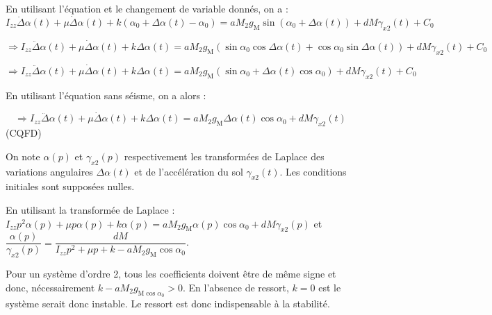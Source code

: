\ifprof
\begin{corrige} 
En utilisant l'équation et le changement de variable donnés, on  a : 
$$I_{z z} \ddot{\Delta}{\alpha}(t)+\mu \dot{\Delta}{\alpha}(t)+k\left(\alpha_{0}+\Delta \alpha(t)-\alpha_{0}\right)=a M_{2} g_{\mathrm{M}} \sin \left(\alpha_{0}+\Delta \alpha(t)\right)+d M \gamma_{x 2}(t)+C_{0}
$$

$$ \Rightarrow 
I_{z z} \ddot{\Delta}{\alpha}(t)+\mu \dot{\Delta}{\alpha}(t)+k\Delta \alpha(t)=a M_{2} g_{\mathrm{M}} \left( 
\sin \alpha_{0} \cos \Delta \alpha(t) + \cos \alpha_{0} \sin \Delta \alpha(t) 
\right)
+d M \gamma_{x 2}(t)+C_{0}
$$


$$ \Rightarrow 
I_{z z} \ddot{\Delta}{\alpha}(t)+\mu \dot{\Delta}{\alpha}(t)+k\Delta \alpha(t)=a M_{2} g_{\mathrm{M}} \left( 
\sin \alpha_{0}  + \Delta \alpha(t) \cos \alpha_{0}  \right)
+d M \gamma_{x 2}(t)+C_{0}
$$

En utilisant l'équation sans séisme, on a alors : 

$$ \Rightarrow 
I_{z z} \ddot{\Delta}{\alpha}(t)+\mu \dot{\Delta}{\alpha}(t)+k\Delta \alpha(t)
=a M_{2} g_{\mathrm{M}} \Delta \alpha(t) \cos \alpha_{0} +d M \gamma_{x 2}(t)
$$
(CQFD)
\end{corrige}
\else
\fi

On note $\alpha(p)$ et $\gamma_{x 2}(p)$ respectivement les transformées de Laplace des variations angulaires $\Delta \alpha(t)$ et de l'accélération du sol $\gamma_{x 2}(t)$. Les conditions initiales sont supposées nulles.

\ifprof
\begin{corrige}
En utilisant la transformée de Laplace : $ 
I_{z z} p^2 {\alpha}(p)+\mu p{\alpha}(p)+k\alpha(p)
=a M_{2} g_{\mathrm{M}} \alpha(p) \cos \alpha_{0} +d M \gamma_{x 2}(p)
$ et 
$\dfrac{\alpha(p)}{\gamma_{x 2}(p)} = \dfrac{d M }{I_{z z} p^2  +\mu p +k -a M_{2} g_{\mathrm{M}}  \cos \alpha_{0}}$.

Pour un système d'ordre 2, tous les coefficients doivent être de même signe et donc, nécessairement 
$k -a M_{2} g_{\mathrm{M}  \cos \alpha_{0}} >0$. En l'absence de ressort, $k=0$ est le système serait donc instable. Le ressort est donc indispensable à la stabilité.
\end{corrige}
\else
\fi

